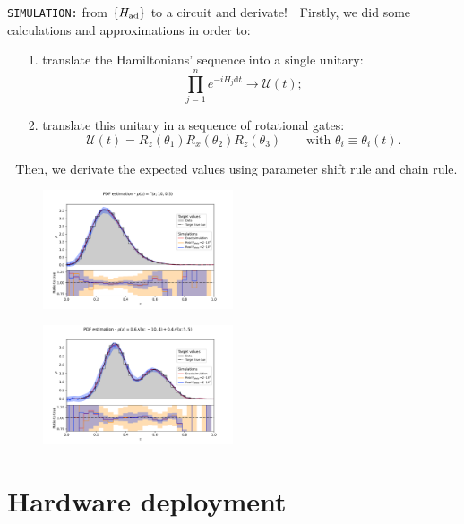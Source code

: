 \documentclass[9pt, xcolor={svgnames}, hyperref={colorlinks, linkcolor=black, citecolor=amethyst, urlcolor=amethyst}]{beamer}
\begin{document}
\begin{frame}{\texttt{SIMULATION:} from $\{H_{\rm ad}\}$ to a circuit and derivate!}
\small
\pause
\faArrowCircleRight\,\, Firstly, we did some calculations and approximations in order to:
\pause
\begin{itemize}[noitemsep]
\item[1.] translate the Hamiltonians' sequence into a single unitary:
$$\prod_{j=1}^{n} e^{-i H_{j}\text{d}t} \to \mathcal{U}(t);$$
\pause 
\item[2.] translate this unitary in a sequence of rotational gates:
$$ \mathcal{U}(t) = R_z(\theta_1)R_x(\theta_2)R_z(\theta_3) \qquad \text{with}\,\, \theta_i \equiv \theta_i(t).$$
\end{itemize}
\pause 
\faArrowCircleRight\,\, Then, we derivate the expected values using parameter shift rule
and chain rule.
\pause 
\begin{multicols}{2}
\begin{figure}
    \includegraphics[width=0.5\textwidth]{figures/PDF_gamma_25_20_200000.pdf}
\end{figure}
\begin{figure}
    \includegraphics[width=0.5\textwidth]{figures/PDF_gauss_30_20_200000.pdf}
\end{figure}
\end{multicols}
\end{frame}

\section{Hardware deployment}
\end{document}
